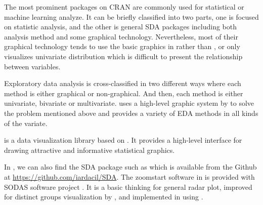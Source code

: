 \documentclass[article]{jss}
\begin{document}
The most prominent packages on CRAN are commonly used for statistical
or machine learning analyze. It can be briefly classified into two
parts, one is focused on statistic analysis, and the other is general
SDA packages including both analysis method and some graphical
technology. Nevertheless, most of their graphical technology tends to
use the basic graphics in  rather than , or
only visualizes univariate distribution which is difficult to present
the relationship between variables.

Exploratory data analysis is cross-classified in two different ways
where each method is either graphical or non-graphical. And then, each
method is either univariate, bivariate or multivariate. 
uses a high-level graphic system by  \cite{ggplot2} to solve the problem
mentioned above and provides a variety of EDA methods in all kinds of
the variate.


 is a  data visualization library based on . It provides
a high-level interface for drawing attractive and informative
statistical graphics.


In , we can also find the SDA package such as
 \cite{umbleja:2020} which is available from the Github
at \url{https://github.com/iardacil/SDA}. The zoomstart software in
 is provided with SODAS software project
\cite{diday:2008}. It is a basic thinking for general radar plot,
improved for distinct groups visualization by , and
implemented in  using .
 
\end{document}
